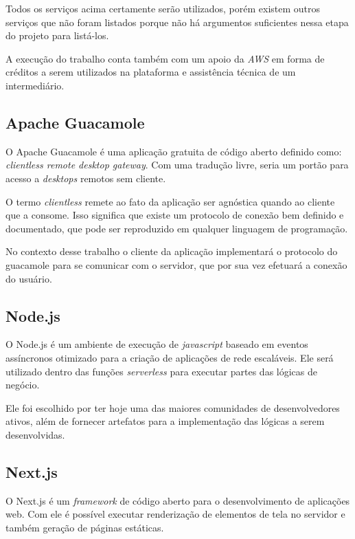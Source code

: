Todos os serviços acima certamente serão utilizados, porém existem outros serviços que não foram listados porque não há argumentos suficientes nessa etapa do projeto para listá-los.

A execução do trabalho conta também com um apoio da \textit{AWS} em forma de créditos a serem utilizados na plataforma e assistência técnica de um intermediário.

\subsection{Apache Guacamole}\label{subsec:apacheGuacamole}

O Apache Guacamole é uma aplicação gratuita de código aberto definido como: \textit{clientless remote desktop gateway}. \citep{apacheguacamole} Com uma tradução livre, seria um portão para acesso a \textit{desktops} remotos sem cliente.

O termo \textit{clientless} remete ao fato da aplicação ser agnóstica quando ao cliente que a consome. Isso significa que existe um protocolo de conexão bem definido e documentado, que pode ser reproduzido em qualquer linguagem de programação. 

No contexto desse trabalho o cliente da aplicação implementará o protocolo do guacamole para se comunicar com o servidor, que por sua vez efetuará a conexão do usuário.


\subsection{Node.js}\label{subsec:nodeJs}

O Node.js é um ambiente de execução de \textit{javascript} baseado em eventos assíncronos otimizado para a criação de aplicações de rede escaláveis. Ele será utilizado dentro das funções \textit{serverless} para executar partes das lógicas de negócio. \citep{nodejs}

Ele foi escolhido por ter hoje uma das maiores comunidades de desenvolvedores ativos, além de fornecer artefatos para a implementação das lógicas a serem desenvolvidas.

\subsection{Next.js}\label{subsec:nextJs}

O Next.js é um \textit{framework} de código aberto para o desenvolvimento de aplicações web. Com ele é possível executar renderização de elementos de tela no servidor e também geração de páginas estáticas. \citep{nextjs}

